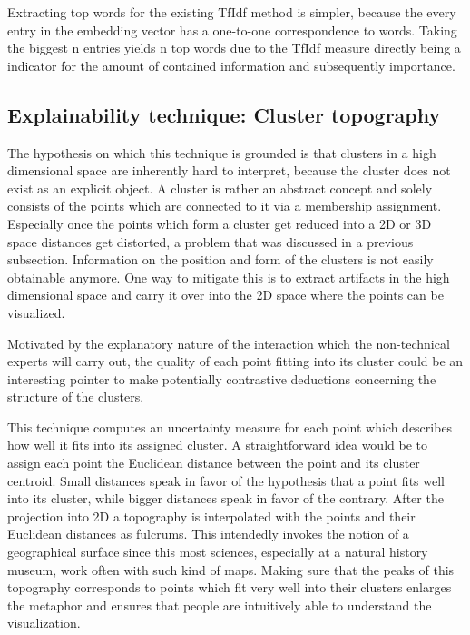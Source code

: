 Extracting top words for the existing TfIdf method is simpler, because the every entry in the embedding vector has a one-to-one correspondence to words. Taking the biggest n entries yields n top words due to the TfIdf measure directly being a indicator for the amount of contained information and subsequently importance.

\subsection{Explainability technique: Cluster topography }

The hypothesis on which this technique is grounded is that clusters in a high dimensional space are inherently hard to interpret, because the cluster does not exist as an explicit object. A cluster is rather an abstract concept and solely consists of the points which are connected to it via a membership assignment. Especially once the points which form a cluster get reduced into a 2D or 3D space distances get distorted, a problem that was discussed in a previous subsection. Information on the position and form of the clusters is not easily obtainable anymore. One way to mitigate this is to extract artifacts in the high dimensional space and carry it over into the 2D space where the points can be visualized.

Motivated by the explanatory nature of the interaction which the non-technical experts will carry out, the quality of each point fitting into its cluster could be an interesting pointer to make potentially contrastive deductions concerning the structure of the clusters.

This technique computes an uncertainty measure for each point which describes how well it fits into its assigned cluster. A straightforward idea would be to assign each point the Euclidean distance between the point and its cluster centroid. Small distances speak in favor of the hypothesis that a point fits well into its cluster, while bigger distances speak in favor of the contrary. After the projection into 2D a topography is interpolated with the points and their Euclidean distances as fulcrums. This intendedly invokes the notion of a geographical surface since this most sciences, especially at a natural history museum, work often with such kind of maps. Making sure that the peaks of this topography corresponds to points which fit very well into their clusters enlarges the metaphor and ensures that people are intuitively able to understand the visualization. 

